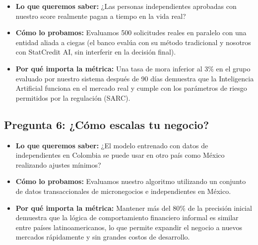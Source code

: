\documentclass[11pt,a4paper]{article}
\begin{document}
\begin{tcolorbox}[colback=lightgray,colframe=secondary,title=\textbf{Experimento 5.2: Prueba piloto a ciegas con entidad financiera}]
\begin{itemize}[leftmargin=*]
    \item \textbf{Lo que queremos saber:} ¿Las personas independientes aprobadas con nuestro score realmente pagan a tiempo en la vida real?
    \item \textbf{Cómo lo probamos:} Evaluamos 500 solicitudes reales en paralelo con una entidad aliada a ciegas (el banco evalúa con su método tradicional y nosotros con StatCredit AI, sin interferir en la decisión final).
    \item \textbf{Por qué importa la métrica:} Una tasa de mora inferior al 3\% en el grupo evaluado por nuestro sistema después de 90 días demuestra que la Inteligencia Artificial funciona en el mercado real y cumple con los parámetros de riesgo permitidos por la regulación (SARC).
\end{itemize}
\end{tcolorbox}

\subsection{Pregunta 6: ¿Cómo escalas tu negocio?}

\begin{tcolorbox}[colback=lightgray,colframe=secondary,title=\textbf{Experimento 6.1: Prueba de adaptación del algoritmo a otro país (México)}]
\begin{itemize}[leftmargin=*]
    \item \textbf{Lo que queremos saber:} ¿El modelo entrenado con datos de independientes en Colombia se puede usar en otro país como México realizando ajustes mínimos?
    \item \textbf{Cómo lo probamos:} Evaluamos nuestro algoritmo utilizando un conjunto de datos transaccionales de micronegocios e independientes en México.
    \item \textbf{Por qué importa la métrica:} Mantener más del 80\% de la precisión inicial demuestra que la lógica de comportamiento financiero informal es similar entre países latinoamericanos, lo que permite expandir el negocio a nuevos mercados rápidamente y sin grandes costos de desarrollo.
\end{itemize}
\end{tcolorbox}
\end{document}
